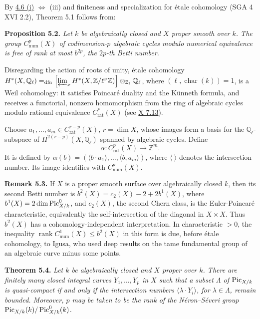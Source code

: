 By \hyperlink{sga6.e13.thm.4-6}{4.6 (i)} \(\Longleftrightarrow\) (iii) and finiteness and specialization
for \'etale cohomology (SGA 4 XVI 2.2), Theorem 5.1 follows from:

\textbf{Proposition 5.2.} \emph{Let \(k\) be algebraically closed and
\(X\) proper smooth over \(k\). The group \(C^p_{\mathrm{num}}(X)\) of
codimension-\(p\) algebraic cycles modulo numerical equivalence is free
of rank at most \(b^{2p}\), the \(2p\)-th Betti number.}

Disregarding the action of roots of unity, \'etale cohomology
\(H^*(X,\mathbb Q_\ell)=_{\mathrm{dfn}}\allowbreak
\left[\varprojlim_\nu H^*(X,\mathbb Z/\ell^\nu\mathbb Z)\right]
\allowbreak\otimes_{\mathbb Z_\ell}\mathbb Q_\ell\), where
\((\ell,\operatorname{char}(k))=1\), is a Weil cohomology: it satisfies
Poincar\'e duality and the K\"unneth formula, and receives a functorial,
nonzero homomorphism from the ring of algebraic cycles modulo rational
equivalence \(C^*_{\mathrm{rat}}(X)\) (see \hyperlink{sga6.e10.sec.7.13}{X 7.13}).

Choose \(a_1,\ldots,a_m\in C^{r-p}_{\mathrm{rat}}(X)\), \(r=\dim X\),
whose images form a basis for the \(\mathbb Q_\ell\)-subspace of
\(H^{2(r-p)}(X,\mathbb Q_\ell)\) spanned by algebraic cycles. Define
\[
\alpha:C^p_{\mathrm{rat}}(X)\longrightarrow\mathbb Z^m.
\]
It is defined by
\(\alpha(b)=(\langle b\cdot a_1\rangle,\ldots,\langle b,a_m\rangle)\),
where \(\langle\ \rangle\) denotes the intersection number. Its image
identifies with \(C^p_{\mathrm{num}}(X)\).

\textbf{Remark 5.3.} If \(X\) is a proper smooth surface over
algebraically closed \(k\), then its second Betti number is
\(b^2(X)=c_2(X)-2+2b^1(X)\), where
\(b^1(X)=2\dim\operatorname{Pic}^0_{X/k}\), and \(c_2(X)\), the second Chern
class, is the Euler-Poincar\'e characteristic, equivalently the
self-intersection of the diagonal in \(X\times X\). Thus \(b^2(X)\) has
a cohomology-independent interpretation. In characteristic \(>0\), the
inequality \(\operatorname{rank}C^1_{\mathrm{num}}(X)\le b^2(X)\) in
this form is due, before \'etale cohomology, to Igusa, who used deep
results on the tame fundamental group of an algebraic curve minus some
points.

\textbf{Theorem 5.4.} \emph{Let \(k\) be algebraically closed and \(X\)
proper over \(k\). There are finitely many closed integral curves
\(Y_1,\ldots,Y_p\) in \(X\) such that a subset \(\Lambda\) of
\(\operatorname{Pic}_{X/k}\) is quasi-compact if and only if the intersection numbers
\(\langle\lambda\cdot Y_i\rangle\), for \(\lambda\in\Lambda\), remain
bounded. Moreover, \(p\) may be taken to be the rank of the
N\'eron--S\'everi group \(\operatorname{Pic}_{X/k}(k)/\operatorname{Pic}^0_{X/k}(k)\).}

